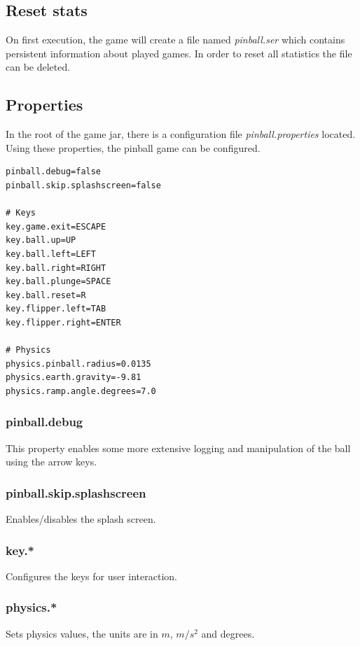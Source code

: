 \documentclass[fontsize=12pt,
               paper=a4,
               twoside=false,
               parskip=half,
               ]{scrartcl}
\begin{document}
\subsection{Reset stats}

On first execution, the game will create a file named \emph{pinball.ser} which contains persistent information about played games. In order to reset all statistics the file can be deleted.

\subsection{Properties}

In the root of the game jar, there is a configuration file \emph{pinball.properties} located. Using these properties, the pinball game can be configured.

\begin{minipage}[]{\linewidth}
\begin{lstlisting}[label=lst:properties,caption={pinball.properties}]
pinball.debug=false
pinball.skip.splashscreen=false

# Keys
key.game.exit=ESCAPE
key.ball.up=UP
key.ball.left=LEFT
key.ball.right=RIGHT
key.ball.plunge=SPACE
key.ball.reset=R
key.flipper.left=TAB
key.flipper.right=ENTER

# Physics
physics.pinball.radius=0.0135
physics.earth.gravity=-9.81
physics.ramp.angle.degrees=7.0
\end{lstlisting}
\end{minipage}

\subsubsection{pinball.debug}

This property enables some more extensive logging and manipulation of the ball using the arrow keys.

\subsubsection{pinball.skip.splashscreen}

Enables/disables the splash screen.

\subsubsection{key.*}

Configures the keys for user interaction.

\subsubsection{physics.*}

Sets physics values, the units are in $m$, $m/s^{2}$ and degrees.
\end{document}
